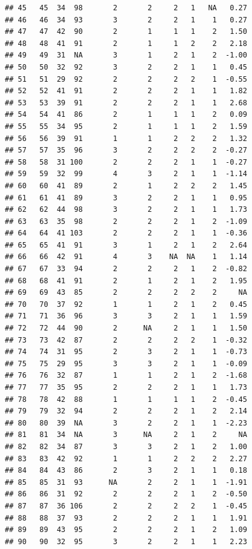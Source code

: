 \documentclass[
]{book}
\begin{document}
\begin{verbatim}
## 45   45  34  98       2       2     2   1   NA   0.27
## 46   46  34  93       3       2     2   1    1   0.27
## 47   47  42  90       2       1     1   1    2   1.50
## 48   48  41  91       2       1     1   2    2   2.18
## 49   49  31  NA       3       1     2   1    2  -1.00
## 50   50  32  92       3       2     2   1    1   0.45
## 51   51  29  92       2       2     2   2    1  -0.55
## 52   52  41  91       2       2     2   1    1   1.82
## 53   53  39  91       2       2     2   1    1   2.68
## 54   54  41  86       2       1     1   1    2   0.09
## 55   55  34  95       2       1     1   1    2   1.59
## 56   56  39  91       1       1     2   2    2   1.32
## 57   57  35  96       3       2     2   2    2  -0.27
## 58   58  31 100       2       2     2   1    1  -0.27
## 59   59  32  99       4       3     2   1    1  -1.14
## 60   60  41  89       2       1     2   2    2   1.45
## 61   61  41  89       3       2     2   1    1   0.95
## 62   62  44  98       3       2     2   1    1   1.73
## 63   63  35  98       2       2     2   1    2  -1.09
## 64   64  41 103       2       2     2   1    1  -0.36
## 65   65  41  91       3       1     2   1    2   2.64
## 66   66  42  91       4       3    NA  NA    1   1.14
## 67   67  33  94       2       2     2   1    2  -0.82
## 68   68  41  91       2       1     2   1    2   1.95
## 69   69  43  85       2       2     2   2    2     NA
## 70   70  37  92       1       1     2   1    2   0.45
## 71   71  36  96       3       3     2   1    1   1.59
## 72   72  44  90       2      NA     2   1    1   1.50
## 73   73  42  87       2       2     2   2    1  -0.32
## 74   74  31  95       2       3     2   1    1  -0.73
## 75   75  29  95       3       3     2   1    1  -0.09
## 76   76  32  87       1       1     2   1    2  -1.68
## 77   77  35  95       2       2     2   1    1   1.73
## 78   78  42  88       1       1     1   1    2  -0.45
## 79   79  32  94       2       2     2   1    2   2.14
## 80   80  39  NA       3       2     2   1    1  -2.23
## 81   81  34  NA       3      NA     2   1    2     NA
## 82   82  34  87       3       3     2   1    2   1.00
## 83   83  42  92       1       1     2   2    2   2.27
## 84   84  43  86       2       3     2   1    1   0.18
## 85   85  31  93      NA       2     2   1    1  -1.91
## 86   86  31  92       2       2     2   1    2  -0.50
## 87   87  36 106       2       2     2   2    1  -0.45
## 88   88  37  93       2       2     2   1    1   1.91
## 89   89  43  95       2       2     2   1    2   1.09
## 90   90  32  95       3       2     2   1    1   2.23

\end{verbatim}
\end{document}
